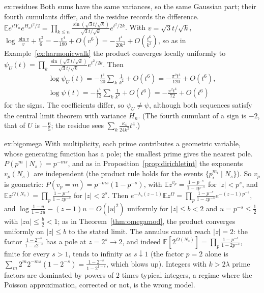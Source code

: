 \begin{solution}{ex:residues}
\idea Both sums have the same variances, so the same Gaussian part; their fourth cumulants differ, and the residue records the difference.
\writeup $\mathbb Ee^{itY_n}e^{H_nt^2/2}=\prod_{k\le n}\frac{\sin(\sqrt3t/\sqrt k)}{\sqrt3t/\sqrt k}e^{t^2/2k}$. With $v=\sqrt3t/\sqrt k$, $\log\frac{\sin v}v+\frac{v^2}6=-\frac{v^4}{180}+O(v^6)=-\frac{t^4}{20k^2}+O(\frac{t^6}{k^3})$, so as in
Example~\ref{ex:harmonicwalk} the product converges locally uniformly to $\psi_U(t)=\prod_k\frac{\sin(\sqrt3t/\sqrt k)}{\sqrt3t/\sqrt k}e^{t^2/2k}$. Then
\[
\begin{gathered}
\log\psi_U(t)=-\frac{t^4}{20}\sum_k\frac1{k^2}+O(t^6)=-\frac{\pi^2t^4}{120}+O(t^6),\\\log\psi(t)=-\frac{t^4}{12}\sum_k\frac1{k^2}+O(t^6)=-\frac{\pi^2t^4}{72}+O(t^6)
\end{gathered}
\]
for the signs. The coefficients differ, so $\psi_U\neq\psi$, although both sequences satisfy the central limit theorem with variance $H_n$. (The fourth cumulant of a sign is $-2$, that of $U$ is $-\frac65$; the residue sees $\sum_k\frac{\kappa_4}{24k^2}t^4$.)
\end{solution}

\begin{solution}{ex:bigomega}
\idea With multiplicity, each prime contributes a geometric variable, whose generating function has a pole; the smallest prime gives the nearest pole.
\writeup $P(p^m\mid N_s)=p^{-ms}$, and as in Proposition~\ref{prop:dirichletint} the exponents $v_p(N_s)$ are independent (the product rule holds for the events $\{p_i^{m_i}\mid N_s\}$). So $v_p$ is geometric: $P(v_p=m)=p^{-ms}(1-p^{-s})$, with
$\mathbb Ez^{v_p}=\frac{1-p^{-s}}{1-zp^{-s}}$ for $|z|<p^s$, and $\mathbb Ez^{\Omega(N_s)}=\prod_p\frac{1-p^{-s}}{1-zp^{-s}}$ for $|z|<2^s$. Then $e^{-\lambda_s(z-1)}\mathbb Ez^{\Omega}=\prod_p\frac{1-p^{-s}}{1-zp^{-s}}e^{-(z-1)p^{-s}}$, and
$\log\frac{1-u}{1-zu}-(z-1)u=O(|u|^2)$ uniformly for $|z|\le b<2$ and $u=p^{-s}\le\frac12$ with $|zu|\le\frac b2<1$; as in Theorem~\ref{thm:omegamod}, the product converges uniformly on $|z|\le b$ to the stated limit. The annulus cannot reach $|z|=2$: the factor
$\frac{1-2^{-s}}{1-z2^{-s}}$ has a pole at $z=2^s\to2$, and indeed $\mathbb E[2^{\Omega(N_s)}]=\prod_p\frac{1-p^{-s}}{1-2p^{-s}}$, finite for every $s>1$, tends to infinity as $s\downarrow1$ (the factor $p=2$ alone is $\sum_m2^m2^{-ms}(1-2^{-s})=\frac{1-2^{-s}}{1-2^{1-s}}$, which blows up). Integers with $k>2\lambda$ prime
factors are dominated by powers of $2$ times typical integers, a regime where the Poisson approximation, corrected or not, is the wrong model.
\end{solution}

